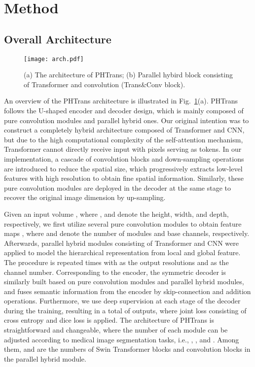 \documentclass[runningheads]{llncs}
\begin{document}
\section{Method}
\subsection{Overall Architecture}
\begin{figure}[t]
\centering
\texttt{[image: arch.pdf]}
\caption{(a) The architecture of PHTrans; (b) Parallel hybird block consisting of Transformer and convolution (Trans\&Conv block).  } \label{fig2}
\end{figure}


An overview of the PHTrans architecture is illustrated in Fig.~\ref{fig2}(a). PHTrans follows the U-shaped encoder and decoder design, which is mainly composed of pure convolution modules and parallel hybrid ones. Our original intention was to construct a completely hybrid architecture composed of Transformer and CNN, but due to the high computational complexity of the self-attention mechanism, Transformer cannot directly receive input with pixels serving as tokens. In our implementation, a cascade of convolution blocks and down-sampling operations are introduced to reduce the spatial size, which progressively extracts low-level features with high resolution to obtain fine spatial information. Similarly, these pure convolution modules are deployed in the decoder at the same stage to recover the original image dimension by up-sampling.

Given an input volume , where ,  and  denote the height, width, and depth, respectively, we first utilize several pure convolution modules to obtain feature maps , where  and  denote the number of modules and base channels, respectively. Afterwards, parallel hybrid modules consisting of Transformer and CNN were applied to model the hierarchical representation from local and global feature. The procedure is repeated  times with  as the output resolutions and  as the channel number. Corresponding to the encoder, the symmetric decoder is similarly built based on pure convolution modules and parallel hybrid modules, and fuses semantic information from the encoder by skip-connection and addition operations. Furthermore, we use deep supervision at each stage of the decoder during the training, resulting in a total of  outputs, where joint loss consisting of cross entropy and dice loss is applied. The architecture of PHTrans is straightforward and changeable, where the number of each module can be adjusted according to medical image segmentation tasks, i.e., , ,  and . Among them,  and  are the numbers of Swin Transformer blocks and convolution blocks in the parallel hybrid module.
\end{document}
